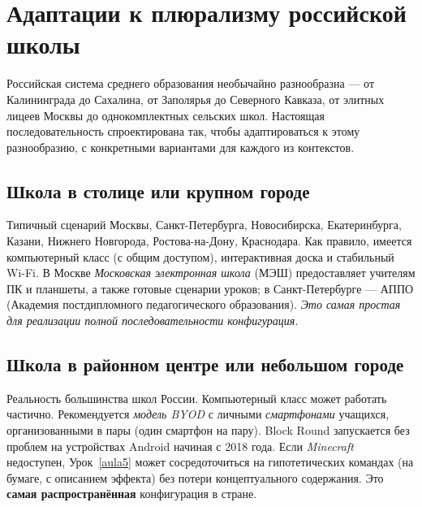 \documentclass[12pt,a4paper]{scrartcl}
\newcommand{\acc}[1]{\textcolor{accent}{\textbf{#1}}}
\begin{document}
\section{Адаптации к плюрализму российской школы}\label{sec:adapt}

Российская система среднего образования необычайно разнообразна --- от Калининграда до Сахалина, от Заполярья до Северного Кавказа, от элитных лицеев Москвы до однокомплектных сельских школ. Настоящая последовательность спроектирована так, чтобы адаптироваться к этому разнообразию, с конкретными вариантами для каждого из контекстов.

\subsection{Школа в столице или крупном городе}
Типичный сценарий Москвы, Санкт-Петербурга, Новосибирска, Екатеринбурга, Казани, Нижнего Новгорода, Ростова-на-Дону, Краснодара. Как правило, имеется компьютерный класс (с общим доступом), интерактивная доска и стабильный Wi-Fi. В Москве \emph{Московская электронная школа} (МЭШ) предоставляет учителям ПК и планшеты, а также готовые сценарии уроков; в Санкт-Петербурге --- АППО (Академия постдипломного педагогического образования). \emph{Это самая простая для реализации полной последовательности конфигурация.}

\subsection{Школа в районном центре или небольшом городе}
Реальность большинства школ России. Компьютерный класс может работать частично. Рекомендуется \emph{модель BYOD} с личными \emph{смартфонами} учащихся, организованными в пары (один смартфон на пару). Block Round запускается без проблем на устройствах Android начиная с 2018 года. Если \emph{Minecraft} недоступен, Урок~\ref{aula5} может сосредоточиться на гипотетических командах (на бумаге, с описанием эффекта) без потери концептуального содержания. Это \acc{самая распространённая} конфигурация в стране.
\end{document}

